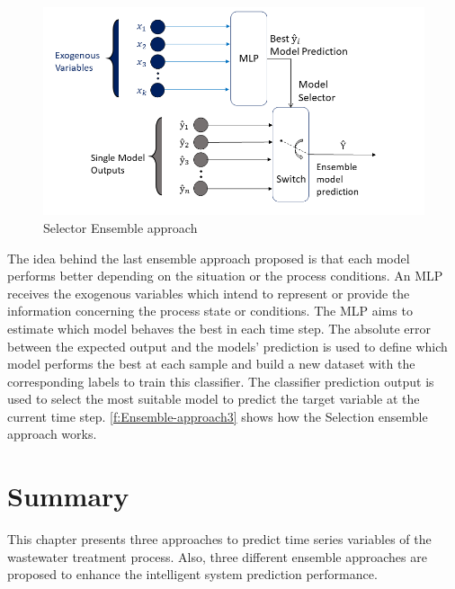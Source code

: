 \begin{figure}[h]
\centering
\includegraphics[width=\linewidth]{figures/Ch4/Ensemble_Approach3.png}
\caption{Selector Ensemble approach}
\label{f:Ensemble-approach3}
\end{figure}

The idea behind the last ensemble approach proposed is that each model performs better depending on the situation or the process conditions. An \ac{MLP} receives the exogenous variables which intend to represent or provide the information concerning the process state or conditions. The \ac{MLP} aims to estimate which model behaves the best in each time step. The absolute error between the expected output and the models' prediction is used to define which model performs the best at each sample and build a new dataset with the corresponding labels to train this classifier. 
The classifier prediction output is used to select the most suitable model to predict the target variable at the current time step. \autoref{f:Ensemble-approach3} shows how the Selection ensemble approach works.

\section{Summary}

\label{s:Contribution-1-Summary}

This chapter presents three approaches to predict time series variables of the wastewater treatment process. Also, three different ensemble approaches are proposed to enhance the intelligent system prediction performance.